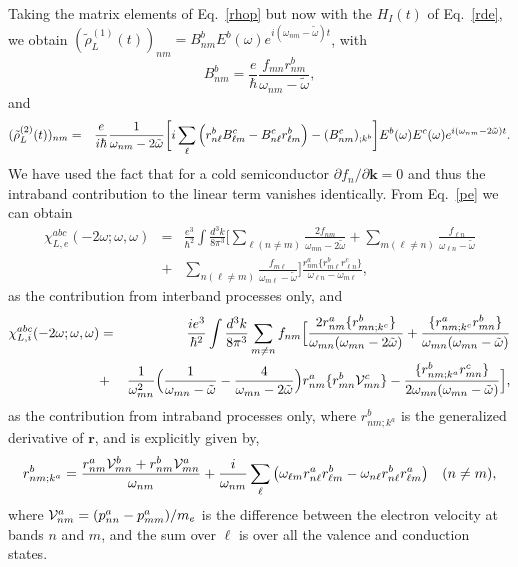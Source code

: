 \documentclass[floatfix,prb,aps,superscriptaddress,11pt]{revtex4}
\begin{document}
Taking the matrix elements of Eq.~\eqref{rhop} but now with the $H_{I}(t)$ of
Eq.~\eqref{rde}, we obtain 
$(\tilde{\rho}_{L}^{(1)}(t))_{nm}=B_{nm}^{b}E^{b}(\omega)e^{i(\omega_{nm}-\tilde\omega)t}$,
with 
\begin{equation*}
B_{nm}^{b}=\frac{e}{\hbar }\frac{f_{mn}r_{nm}^{b}}{\omega_{nm}-\tilde\omega},
\label{rho11}
\end{equation*}
and 
\begin{eqnarray*}
(\tilde{\rho}_{L}^{(2)}(t))_{nm} &=&\frac{e}{i\hbar }\frac{1}{\omega_{nm}-2\tilde\omega}\bigg[
i\sum_{\ell }\Big(r_{n\ell }^{b}B_{\ell m}^{c}-B_{n\ell }^{c}r_{\ell m}^{b}
\Big)  \notag 
-(B_{nm}^{c})_{;k^{b}}\bigg]E^{b}(\omega)E^{c}(\omega)e^{i(\omega_{nm}-2\tilde\omega)t}
.
\end{eqnarray*}
We have used the fact that for a cold semiconductor $\partial
f_{n}/\partial \mathbf{k}=0$ and thus the intraband contribution to the linear
term vanishes identically. 
From Eq.~\eqref{pe} we can obtain\cite{aversaPRB95} 
\begin{eqnarray*}\label{chie}
\chi _{L,e}^{abc}(-2\omega;\omega,\omega)
&=&
\frac{e^{3}}{\hbar^{2}}\int \frac{d^{3}k}{8\pi ^{3}}
\Big[
\sum_{\ell(n\neq m)}
\frac{2f_{nm}}{\omega_{mn}-2\tilde\omega}
+
\sum_{m(\ell\neq n)}
\frac{f_{\ell n}}{\omega_{\ell n}-\tilde\omega}
\nonumber\\
&+&
\sum_{n(\ell\neq m)}
\frac{f_{m\ell }}{\omega_{m\ell }-\tilde\omega}
\Big]
\frac{r_{nm}^{a}\{r_{m\ell }^{b}r_{\ell n}^{c}\}}{\omega_{\ell n}-\omega_{m\ell }}
,
\end{eqnarray*}
as the contribution from interband processes only, and 
\begin{eqnarray*}
\chi _{L,i}^{abc}(-2\omega;\omega,\omega) &=&\frac{ie^{3}}{\hbar ^{2}}\int \frac{
d^{3}k}{8\pi ^{3}}\sum_{m\neq n}f_{nm}\Big[\frac{2r_{nm}^{a}\{r_{mn;k^{c}}^{b}\}}{
\omega_{mn}(\omega_{mn}-2\tilde\omega)}+\frac{\{r_{nm;k^{c}}^{a}r_{mn}^{b}\}}{\omega_{mn}(\omega
_{mn}-\tilde\omega)}  \notag  \label{chii} \\
&+&\frac{1}{\omega_{mn}^{2}}\Big(\frac{1}{\omega_{mn}-\tilde\omega}-\frac{4}{\omega_{mn}-2\tilde\omega
}\Big)r_{nm}^{a}\{r_{mn}^{b}{\cal V}_{mn}^{c}\}-\frac{
\{r_{nm;k^{a}}^{b}r_{mn}^{c}\}}{2\omega_{mn}(\omega_{mn}-\tilde\omega)}\Big],
\end{eqnarray*}
as the contribution from intraband processes only, where $r_{nm;k^{a}}^{b}$
is the generalized derivative of $\mathbf{r}$, 
and is explicitly given by,\cite{aversaPRB95} 
\begin{equation}\label{rgen}
r_{nm;k^{a}}^{b}=\frac{r_{nm}^{a}{\cal V}_{mn}^{b}+r_{nm}^{b}{\cal V}_{mn}^{a}}{\omega
_{nm}}+\frac{i}{\omega_{nm}}\sum_{\ell }\big(\omega_{\ell m}r_{n\ell }^{a}r_{\ell
m}^{b}-\omega_{n\ell }r_{n\ell }^{b}r_{\ell m}^{a}\big)\quad (n\neq m),
\end{equation}
where ${\cal V}_{nm}^{a}=(p_{nn}^{a}-p_{mm}^{a})/m_e$ is the difference between the
electron velocity at bands $n$ and $m$, and the sum over $\ell $ is over all
the valence and conduction states. 
\end{document}
